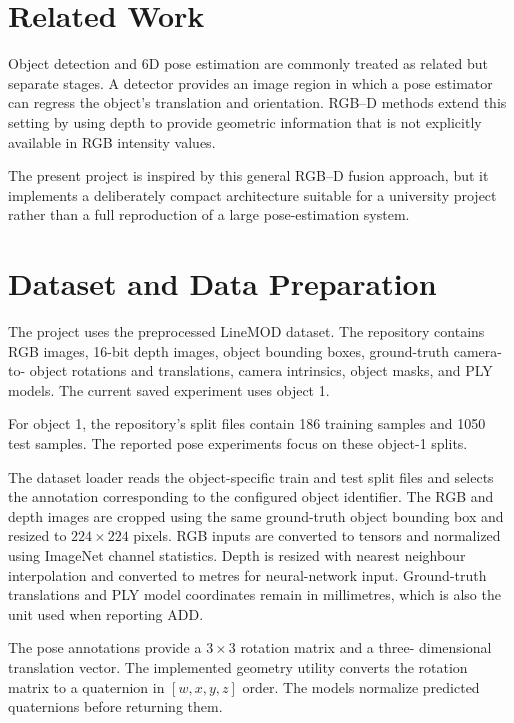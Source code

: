 \documentclass[11pt,a4paper]{article}
\begin{document}
\section{Related Work}

Object detection and 6D pose estimation are commonly treated as related but
separate stages. A detector provides an image region in which a pose estimator
can regress the object's translation and orientation. RGB--D methods extend
this setting by using depth to provide geometric information that is not
explicitly available in RGB intensity values.

The present project is inspired by this general RGB--D fusion approach, but it
implements a deliberately compact architecture suitable for a university
project rather than a full reproduction of a large pose-estimation system.


\section{Dataset and Data Preparation}

The project uses the preprocessed LineMOD dataset. The repository contains
RGB images, 16-bit depth images, object bounding boxes, ground-truth camera-to-
object rotations and translations, camera intrinsics, object masks, and PLY
models. The current saved experiment uses object 1.

For object 1, the repository's split files contain 186 training samples and
1050 test samples. The reported pose experiments focus on these object-1
splits.

The dataset loader reads the object-specific train and test split files and
selects the annotation corresponding to the configured object identifier. The
RGB and depth images are cropped using the same ground-truth object bounding
box and resized to $224\times224$ pixels. RGB inputs are converted to tensors
and normalized using ImageNet channel statistics. Depth is resized with nearest
neighbour interpolation and converted to metres for neural-network input.
Ground-truth translations and PLY model coordinates remain in millimetres,
which is also the unit used when reporting ADD.

The pose annotations provide a $3\times3$ rotation matrix and a three-
dimensional translation vector. The implemented geometry utility converts the
rotation matrix to a quaternion in $[w,x,y,z]$ order. The models normalize
predicted quaternions before returning them.
\end{document}
